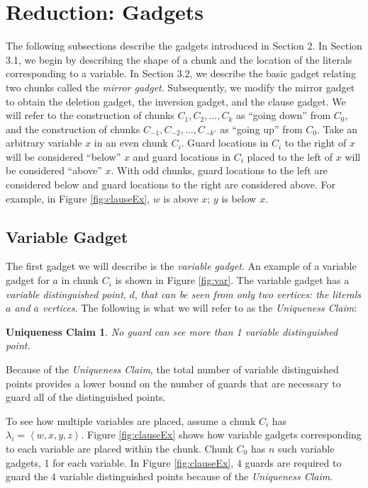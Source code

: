 \documentclass[11pt]{article}
\newtheorem*{uc}{Uniqueness Claim}
\begin{document}
\section{Reduction: Gadgets}
The following subsections describe the gadgets introduced in Section 2. In Section 3.1,
we begin by describing the shape of a chunk and the location of the literals corresponding to a variable.  In
Section 3.2, we describe the basic gadget relating two chunks called the \textit{mirror gadget}.  
Subsequently, we modify the mirror gadget to obtain the deletion gadget, the inversion gadget,
and the clause gadget. We will refer to the construction of chunks $C_1, C_2, \ldots, C_k$ as ``going down''
from $C_0$, and the construction of chunks $C_{-1}, C_{-2}, \ldots, C_{-k'}$ as ``going up'' from
$C_0$.  Take an arbitrary variable $x$ in an even chunk $C_i$.  Guard locations in $C_i$ to the right of $x$ will be considered ``below'' $x$ and guard locations in $C_i$ placed to the left of $x$ will be considered ``above'' $x$.  With odd chunks, guard locations to the left are considered below and guard locations to the right are considered above.  For example, in Figure \ref{fig:clauseEx}, $w$ is above $x$; $y$ is below $x$.

\subsection{Variable Gadget}

The first gadget we will describe is the \textit{variable gadget}.  An example of a variable gadget for $a$ in chunk $C_i$ is shown in Figure \ref{fig:var}.  The variable gadget has a \textit{variable distinguished point}, $d$, {\em that can be seen from only two vertices: the literals $a$ and $\overline{a}$ vertices}.  The following is what we will refer to as the {\em Uniqueness Claim}:



\begin{uc}
No guard can see more than 1 variable distinguished point. 
\end{uc}
 
Because of the {\em Uniqueness Claim}, the total number of variable distinguished points provides a lower bound on the number of guards that are necessary to guard all of the distinguished points.

To see how multiple variables are placed, assume a chunk $C_i$ has $\lambda_i = \left<w,x,y,z\right>$.  Figure \ref{fig:clauseEx} shows how variable gadgets corresponding to each variable are placed within the chunk.  Chunk $C_0$ has $n$ such variable gadgets, 1 for each variable.  In Figure \ref{fig:clauseEx}, $4$ guards are required to guard the $4$ variable distinguished points because of the {\em Uniqueness Claim}.  
\end{document}
